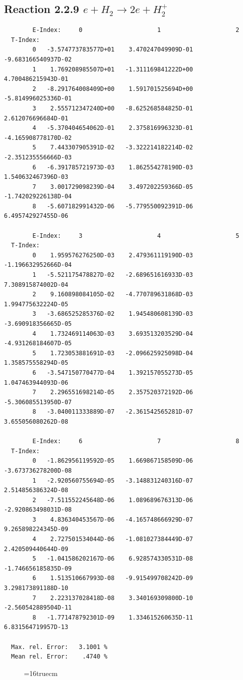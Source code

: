\documentclass[12pt,dvips]{article}
\begin{document}
\subsection{
Reaction 2.2.9  $  e + H_2       \rightarrow 2e + H_2^+  $
}



\begin{small}\begin{verbatim}
        E-Index:     0                     1                     2
  T-Index:
        0   -3.574773783577D+01    3.470247049909D-01   -9.683166540937D-02
        1    1.769208985507D+01   -1.311169841222D+00    4.700486215943D-01
        2   -8.291764008409D+00    1.591701525694D+00   -5.814996025336D-01
        3    2.555712347240D+00   -8.625268584825D-01    2.612076696684D-01
        4   -5.370404654062D-01    2.375816996323D-01   -4.165908778170D-02
        5    7.443307905391D-02   -3.322214182214D-02   -2.351235556666D-03
        6   -6.391785721973D-03    1.862554278190D-03    1.540632467396D-03
        7    3.001729098239D-04    3.497202259366D-05   -1.742029226138D-04
        8   -5.607182991432D-06   -5.779550092391D-06    6.495742927455D-06

        E-Index:     3                     4                     5
  T-Index:
        0    1.959576276250D-03    2.479361119190D-03   -1.196632952666D-04
        1   -5.521175478827D-02   -2.689651616933D-03    7.308915874002D-04
        2    9.160898084105D-02   -4.770789631868D-03    1.994775632224D-05
        3   -3.686525285376D-02    1.945480608139D-03   -3.690918356665D-05
        4    1.732469114063D-03    3.693513203529D-04   -4.931268184607D-05
        5    1.723053881691D-03   -2.096625925098D-04    1.358575558294D-05
        6   -3.547150770477D-04    1.392157055273D-05    1.047463944093D-06
        7    2.296551698214D-05    2.357520372192D-06   -5.306085513950D-07
        8   -3.040011333889D-07   -2.361542565281D-07    3.655056080262D-08

        E-Index:     6                     7                     8
  T-Index:
        0   -1.862956119592D-05    1.669867158509D-06   -3.673736278200D-08
        1   -2.920560755694D-05   -3.148831240316D-07    2.514856386324D-08
        2   -7.511552245648D-06    1.089689676313D-06   -2.920863498031D-08
        3    4.836340453567D-06   -4.165748666929D-07    9.265898224345D-09
        4    2.727501534044D-06   -1.081027384449D-07    2.420509440644D-09
        5   -1.041586202167D-06    6.928574330531D-08   -1.746656185835D-09
        6    1.513510667993D-08   -9.915499708242D-09    3.298173891188D-10
        7    2.223137028418D-08    3.340169309800D-10   -2.560542889504D-11
        8   -1.771478792301D-09    1.334615260635D-11    6.831564719957D-13

  Max. rel. Error:   3.1001 %
  Mean rel. Error:    .4740 %

\end{verbatim}\end{small}
\begin{figure} \label{2.2.9}
\epsfxsize=16truecm
\end{figure}
\newpage
\end{document}
